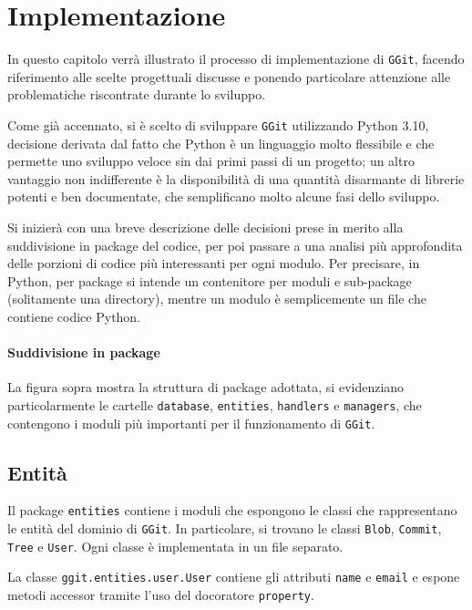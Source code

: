 \chapter{Implementazione}
In questo capitolo verrà illustrato il processo di implementazione di \texttt{GGit}, facendo riferimento alle scelte progettuali discusse e ponendo particolare attenzione alle problematiche riscontrate durante lo sviluppo.

Come già accennato, si è scelto di sviluppare \texttt{GGit} utilizzando Python 3.10, decisione derivata dal fatto che Python è un linguaggio molto flessibile e che permette uno sviluppo veloce sin dai primi passi di un progetto; un altro vantaggio non indifferente è la disponibilità di una quantità disarmante di librerie potenti e ben documentate, che semplificano molto alcune fasi dello sviluppo.

Si inizierà con una breve descrizione delle decisioni prese in merito alla suddivisione in package del codice, per poi passare a una analisi più approfondita delle porzioni di codice più interessanti per ogni modulo. Per precisare, in Python, per package si intende un contenitore per moduli e sub-package (solitamente una directory), mentre un modulo è semplicemente un file che contiene codice Python.

\subsubsection{Suddivisione in package}



La figura sopra mostra la struttura di package adottata, si evidenziano particolarmente le cartelle \texttt{database}, \texttt{entities}, \texttt{handlers} e \texttt{managers}, che contengono i moduli più importanti per il funzionamento di \texttt{GGit}.

\section{Entità}

Il package \texttt{entities} contiene i moduli che espongono le classi che rappresentano le entità del dominio di \texttt{GGit}. In particolare, si trovano le classi \texttt{Blob}, \texttt{Commit}, \texttt{Tree} e \texttt{User}. Ogni classe è implementata in un file separato.



La classe \texttt{ggit.entities.user.User} contiene gli attributi \texttt{name} e \texttt{email} e espone metodi accessor tramite l'uso del docoratore \texttt{property}.

